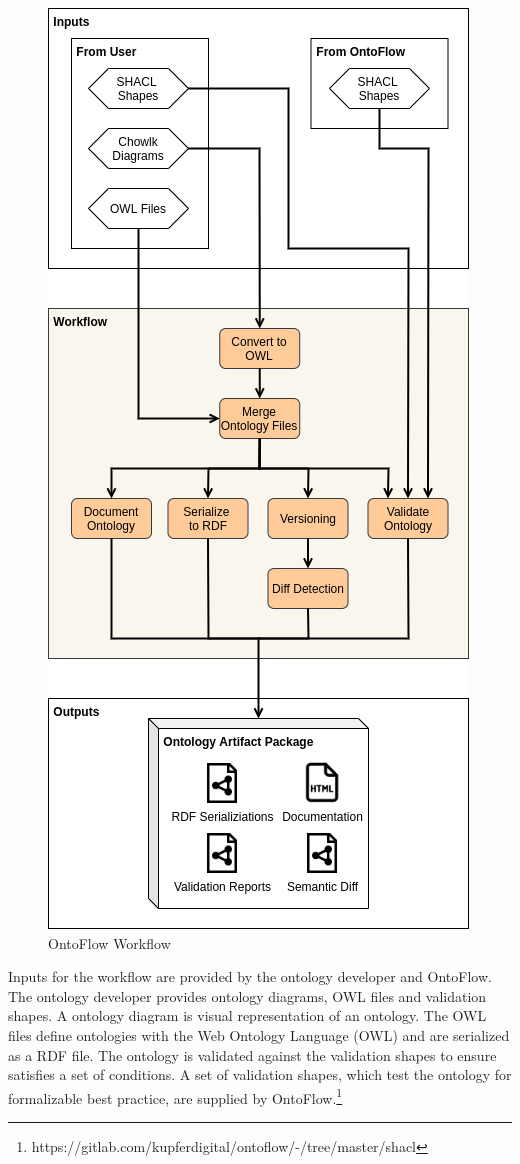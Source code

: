 \documentclass[sigconf]{acmart}
\begin{document}
\begin{figure}[ht]
  \centering
  \includegraphics[scale = 0.4]{workflow.png}
  \caption{OntoFlow Workflow}
  \label{fig2}
\end{figure}

Inputs for the workflow are provided by the ontology developer and OntoFlow.
The ontology developer provides ontology diagrams, OWL files and validation shapes.
A ontology diagram is visual representation of an ontology.
The OWL files define ontologies with the Web Ontology Language (OWL) and are serialized as a RDF file.
The ontology is validated against the validation shapes to ensure satisfies a set of conditions.
A set of validation shapes, which test the ontology for formalizable best practice, are supplied by OntoFlow.\footnote{https://gitlab.com/kupferdigital/ontoflow/-/tree/master/shacl}
\end{document}
